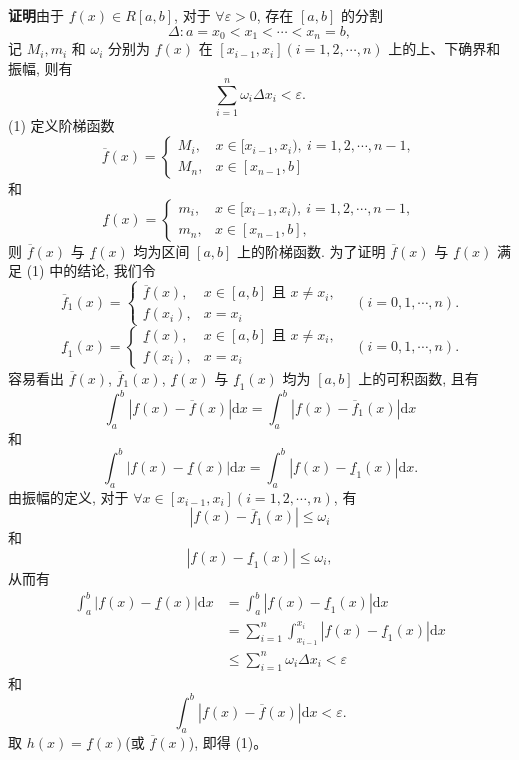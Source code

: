 \documentclass[UTF8,12pt,a4paper,fontset=fandol]{ctexart}
\begin{document}
\noindent\textbf{证明}\quad 由于 $f(x)\in R[a,b]$, 对于 $\forall\varepsilon>0$, 存在 $[a,b]$ 的分割
\[
  \Delta:a=x_0<x_1<\cdots<x_n=b,
\]
记 $M_i,m_i$ 和 $\omega_i$ 分别为 $f(x)$ 在 $[x_{i-1},x_i](i=1,2,\cdots,n)$ 上的上、下确界和振幅, 则有
\[
  \sum_{i=1}^n\omega_i\Delta x_i<\varepsilon.
\]
(1) 定义阶梯函数
\[
  \overline f(x)=
  \begin{cases}
    M_i, & x\in[x_{i-1},x_i),\ i=1,2,\cdots,n-1,\\
    M_n, & x\in[x_{n-1},b]
  \end{cases}
\]
和
\[
  \underline f(x)=
  \begin{cases}
    m_i, & x\in[x_{i-1},x_i),\ i=1,2,\cdots,n-1,\\
    m_n, & x\in[x_{n-1},b],
  \end{cases}
\]
则 $\overline f(x)$ 与 $\underline f(x)$ 均为区间 $[a,b]$ 上的阶梯函数. 为了证明 $\overline f(x)$ 与 $\underline f(x)$ 满足 (1) 中的结论, 我们令
\[
  \overline f_1(x)=
  \begin{cases}
    \overline f(x), & x\in[a,b]\text{ 且 }x\neq x_i,\\
    f(x_i), & x=x_i
  \end{cases}
  \quad(i=0,1,\cdots,n).
\]
\[
  \underline f_1(x)=
  \begin{cases}
    \underline f(x), & x\in[a,b]\text{ 且 }x\neq x_i,\\
    f(x_i), & x=x_i
  \end{cases}
  \quad(i=0,1,\cdots,n).
\]
容易看出 $\overline f(x)$, $\overline f_1(x)$, $\underline f(x)$ 与 $\underline f_1(x)$ 均为 $[a,b]$ 上的可积函数, 且有
\[
  \int_a^b |f(x)-\overline f(x)|\mathrm dx
  =\int_a^b |f(x)-\overline f_1(x)|\mathrm dx
\]
和
\[
  \int_a^b |f(x)-\underline f(x)|\mathrm dx
  =\int_a^b |f(x)-\underline f_1(x)|\mathrm dx.
\]
由振幅的定义, 对于 $\forall x\in[x_{i-1},x_i](i=1,2,\cdots,n)$, 有
\begin{equation}
  |f(x)-\overline f_1(x)|\leq\omega_i
  \tag{7.3.2}
\end{equation}
和
\begin{equation}
  |f(x)-\underline f_1(x)|\leq\omega_i,
  \tag{7.3.3}
\end{equation}
从而有
\[
\begin{aligned}
  \int_a^b |f(x)-\underline f(x)|\mathrm dx
  &=\int_a^b |f(x)-\underline f_1(x)|\mathrm dx\\
  &=\sum_{i=1}^n\int_{x_{i-1}}^{x_i}|f(x)-\underline f_1(x)|\mathrm dx\\
  &\leq \sum_{i=1}^n\omega_i\Delta x_i<\varepsilon
\end{aligned}
\]
和
\[
  \int_a^b |f(x)-\overline f(x)|\mathrm dx<\varepsilon.
\]
取 $h(x)=\underline f(x)$(或 $\overline f(x)$), 即得 (1)。
\end{document}
